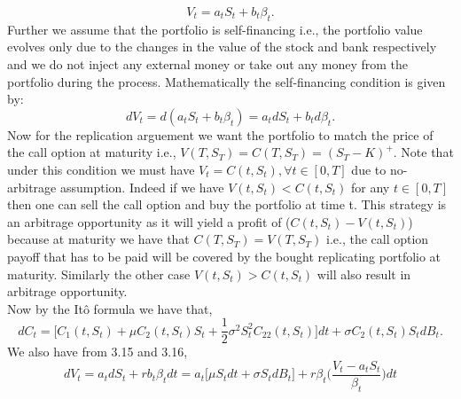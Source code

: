 \documentclass[12pt]{report}
\begin{document}
\begin{equation}
    V_t = a_{t}S_{t} + b_t\beta_{t}.
\end{equation}
Further we assume that the portfolio is self-financing i.e., the portfolio value evolves only due to the changes in the value of the stock and bank respectively and we do not inject any external money or take out any money from the portfolio during the process. Mathematically the self-financing condition is given by:\\
\begin{equation}
   dV_t = d(a_{t}S_{t} + b_t\beta_{t}) = a_{t}dS_{t} + b_td\beta_{t}. 
\end{equation}
Now for the replication arguement we want the portfolio to match the price of the call option at maturity i.e., $V(T,S_T) = C(T,S_T) = (S_T-K)^{+}$. Note that under this condition we must have $V_t=C(t,S_t) ,\forall t \in [0,T]$ due to no-arbitrage assumption. Indeed if we have $V(t,S_t) < C(t,S_t) $ for any $t \in [0,T]$ then one can sell the call option and buy the portfolio at time t. This strategy is an arbitrage opportunity as it will yield a profit of \Big($C(t,S_t) - V(t,S_t)$\Big) because at maturity we have that $C(T,S_T) = V(T,S_T)$ i.e., the call option payoff that has to be paid will be covered by the bought replicating portfolio at maturity. Similarly the other case $V(t,S_t) > C(t,S_t) $ will also result in arbitrage opportunity.\\
Now by the Itô formula we have that,\\
\begin{equation}
    dC_t = \Big[C_{1}(t,S_t) + \mu C_{2}(t,S_t) S_t + \frac{1}{2} \sigma^{2} S_t^{2} C_{22}(t,S_t)\Big]dt + \sigma C_2(t,S_t)S_t dB_t.
\end{equation}
We also have from 3.15 and 3.16,\\
$$dV_t = a_{t}dS_{t} + r b_t \beta_t dt = a_t\Big[\mu S_{t}dt + \sigma S_{t}dB_t\Big] + r \beta_t \Big(\frac{V_t - a_t S_t}{\beta_t}\Big) dt$$
\end{document}
